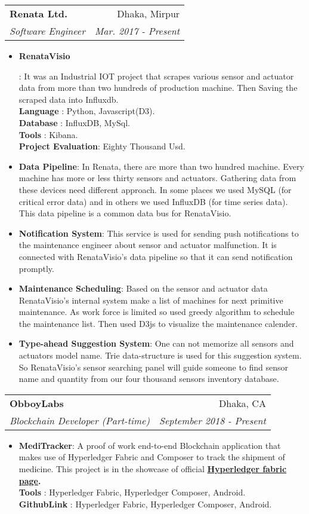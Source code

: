 \documentclass[letterpaper,11pt]{article}
\makeatletter
\newcommand{\resumeItem}[2]{
  \item\small{
    \textbf{#1}{: #2 \vspace{-2pt}}
  }
}
\newcommand{\resumeSubheading}[4]{
  \vspace{-1pt}\item
    \begin{tabular*}{0.97\textwidth}{l@{\extracolsep{\fill}}r}
      \textbf{#1} & #2 \\
      \textit{\small#3} & \textit{\small #4} \\
    \end{tabular*}\vspace{-5pt}
}
\newcommand{\resumeSubHeadingListEnd}{\end{itemize}}
\newcommand{\resumeItemListStart}{\begin{itemize}}
\newcommand{\resumeItemListEnd}{\end{itemize}\vspace{-5pt}}
\makeatother
\begin{document}
    \resumeSubheading
      {Renata Ltd.}{Dhaka, Mirpur}
      {Software Engineer}{Mar. 2017 - Present}
      \resumeItemListStart
        \resumeItem{RenataVisio}{ It was an Industrial IOT project that scrapes various sensor and actuator data from more than two hundreds of production machine. Then Saving the scraped data into Influxdb.\\
    \smallskip 
	  \hspace{20pt}\textbf{Language} : {Python, Javascript(D3).}\\
	  \hspace{20pt}\textbf{Database} : {InfluxDB, MySql.}\\
	 \hspace{20pt}\textbf{Tools} : {Kibana.}\\
	 \hspace{20pt}\textbf{Project Evaluation}: {Eighty Thousand Usd.}
	 
	 
	 }
	 \smallskip
	  
        \resumeItem{Data Pipeline}
          {In Renata, there are more than two hundred machine. Every machine has more or less thirty sensors and actuators. Gathering data from these devices need different approach. In some places we used MySQL (for critical error data) and in others we used InfluxDB (for time series data). This data pipeline is a common data bus for RenataVisio.}
    \smallskip
      \resumeItem{Notification System}
          {This service is used for sending push notifications to the maintenance engineer about sensor and actuator malfunction. It is connected with RenataVisio's data pipeline so that it can send notification promptly.}
          \smallskip
    \resumeItem{Maintenance Scheduling}
          {Based on the sensor and actuator data RenataVisio's internal system make a list of machines for next primitive maintenance. As work force is limited so  used greedy algorithm to schedule the maintenance list. Then used D3js to visualize the maintenance calender. }
          \smallskip
    \resumeItem{Type-ahead Suggestion System}
          {One can not memorize all sensors and actuators model name. Trie data-structure is used for this suggestion system. So RenataVisio's sensor searching panel will guide someone to find sensor name and quantity from our four thousand sensors inventory database.}
      \resumeItemListEnd

    \resumeSubheading
      {ObboyLabs}{Dhaka, CA}
      {Blockchain Developer (Part-time)}{September 2018 - Present}
      \resumeItemListStart
        \resumeItem{MediTracker}
          {A proof of work end-to-end Blockchain application that makes use of Hyperledger Fabric and Composer to track the shipment of medicine. This project is in the showcase of official \textbf{\href{https://www.hyperledger.org/resources/blockchain-showcase?profile=obboy-labs}{Hyperledger fabric page}.}}\\
	\smallskip 
	  \hspace{20pt}\textbf{Tools} : {Hyperledger Fabric, Hyperledger Composer, Android.}\\
	  \hspace{20pt}\textbf{GithubLink} : {Hyperledger Fabric, Hyperledger Composer, Android.}
  \resumeSubHeadingListEnd
\end{document}
